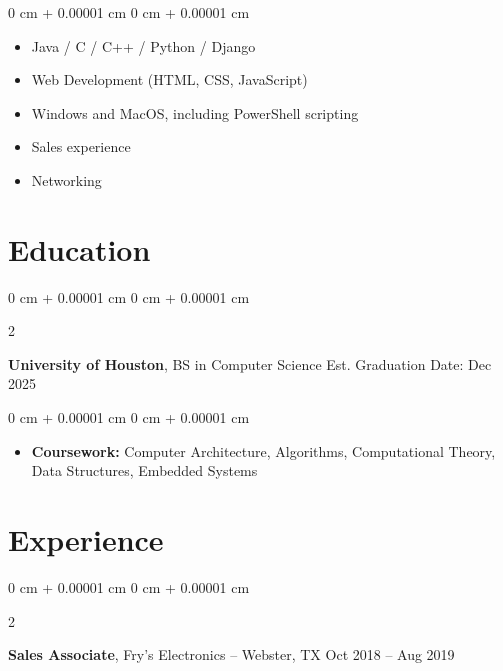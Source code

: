 \documentclass[10pt, letterpaper]{article}
\newenvironment{highlights}{
    \begin{itemize}[
        topsep=0.10 cm,
        parsep=0.10 cm,
        partopsep=0pt,
        itemsep=0pt,
        leftmargin=0 cm + 10pt
    ]
}{
    \end{itemize}
} %
\newenvironment{highlightsforbulletentries}{
    \begin{itemize}[
        topsep=0.10 cm,
        parsep=0.10 cm,
        partopsep=0pt,
        itemsep=0pt,
        leftmargin=10pt
    ]
}{
    \end{itemize}
} %
\newenvironment{onecolentry}{
    \begin{adjustwidth}{
        0 cm + 0.00001 cm
    }{
        0 cm + 0.00001 cm
    }
}{
    \end{adjustwidth}
} %
\newenvironment{twocolentry}[2][]{
    \onecolentry
    \def\secondColumn{#2}
    \setcolumnwidth{\fill, 4.5 cm}
    \begin{paracol}{2}
}{
    \switchcolumn \raggedleft \secondColumn
    \end{paracol}
    \endonecolentry
} %
\begin{document}
    \begin{onecolentry}
        \begin{highlightsforbulletentries}


        \item Java / C / C++ / Python / Django

        \item Web Development (HTML, CSS, JavaScript)

        \item Windows and MacOS, including PowerShell scripting

        \item Sales experience

        \item Networking


        \end{highlightsforbulletentries}
    \end{onecolentry}

    \section{Education}



        
        \begin{twocolentry}{
            Est. Graduation Date: Dec 2025
        }
            \textbf{University of Houston}, BS in Computer Science\end{twocolentry}

        \vspace{0.10 cm}
        \begin{onecolentry}
            \begin{highlights}
                \item \textbf{Coursework:} Computer Architecture, Algorithms, Computational Theory, Data Structures, Embedded Systems
            \end{highlights}
        \end{onecolentry}



    
    \section{Experience}



        
        \begin{twocolentry}{
            Oct 2018 – Aug 2019
        }
            \textbf{Sales Associate}, Fry's Electronics -- Webster, TX\end{twocolentry}
\end{document}
